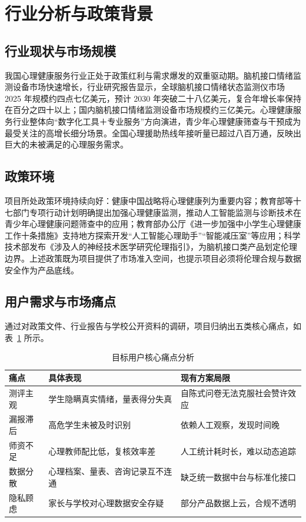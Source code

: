 \documentclass[zihao=-4,fontset=windows,a4paper]{ctexart}
\begin{document}
\section{行业分析与政策背景}

\subsection{行业现状与市场规模}

我国心理健康服务行业正处于政策红利与需求爆发的双重驱动期。脑机接口情绪监测设备市场快速增长，行业研究报告显示，全球脑机接口情绪状态监测仪市场 2025 年规模约四点七亿美元，预计 2030 年突破二十八亿美元，复合年增长率保持在百分之四十以上\cite{ref12}；国内脑机接口情绪监测设备市场规模约三亿美元\cite{ref12}。心理健康服务行业整体向“数字化工具＋专业服务”方向演进，青少年心理健康筛查与干预成为最受关注的高增长细分场景\cite{ref12}。全国心理援助热线年接听量已超过八百万通\cite{ref13}，反映出巨大的未被满足的心理服务需求。

\subsection{政策环境}

项目所处政策环境持续向好：健康中国战略将心理健康列为重要内容；教育部等十七部门专项行动计划明确提出加强心理健康监测，推动人工智能监测与诊断技术在青少年心理健康问题筛查中的应用\cite{ref1}；教育部办公厅《进一步加强中小学生心理健康工作十条措施》支持地方探索开发“人工智能心理助手”“智能减压室”等应用\cite{ref3}；科学技术部发布《涉及人的神经技术医学研究伦理指引》，为脑机接口类产品划定伦理边界\cite{ref11}。上述政策既为项目提供了市场准入空间，也提示项目必须将伦理合规与数据安全作为产品底线。

\subsection{用户需求与市场痛点}

通过对政策文件、行业报告与学校公开资料的调研，项目归纳出五类核心痛点，如表~\ref{tab:pain} 所示。

\begin{table}[H]
\centering
\caption{目标用户核心痛点分析}
\label{tab:pain}
\begin{tabular}{p{3.4cm}p{5.6cm}p{5.2cm}}
\toprule
\textbf{痛点} & \textbf{具体表现} & \textbf{现有方案局限} \\
\midrule
测评主观 & 学生隐瞒真实情绪，量表得分失真 & 自陈式问卷无法克服社会赞许效应 \\
漏报滞后 & 高危学生未被及时识别 & 依赖人工观察，发现时间晚 \\
师资不足 & 心理教师配比低，复核效率差 & 人工统计耗时长，难以动态追踪 \\
数据分散 & 心理档案、量表、咨询记录互不连通 & 缺乏统一数据中台与标准化接口 \\
隐私顾虑 & 家长与学校对心理数据安全存疑 & 部分产品数据上云，合规不透明 \\
\bottomrule
\end{tabular}
\end{table}
\end{document}
